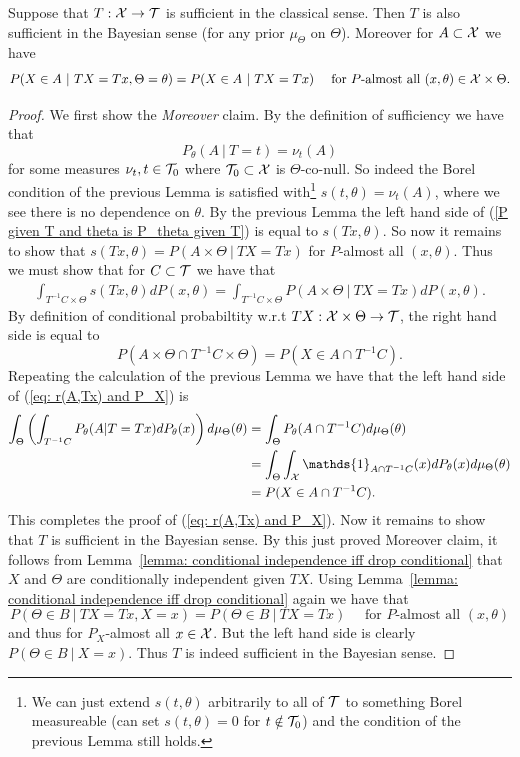 \documentclass[twoside, a4paper, 10pt]{amsart}
\begin{document}
\begin{thm} Suppose that $T:\mathcal{X} \to \mathcal{T}$ is sufficient in the classical sense. Then $T$ is also sufficient in the Bayesian sense (for any prior $\mu_{\Theta}$ on $\Theta$). Moreover for $A \subset \mathcal{X}$ we have \begin{align}\label{P given T and theta is P_theta given T} P(X \in A~|~ TX=Tx, \Theta = \theta) = P(X \in A~|~ TX=Tx)\quad \text{ for $P$-almost all $(x,\theta) \in \mathcal{X} \times \Theta$}.\end{align}

\end{thm}

\begin{proof} We first show the \textit{Moreover} claim. By the definition of sufficiency we have that $$P_{\theta}(A ~|~ T=t) = \nu_t(A) $$ for some measures $\nu_t, t \in \mathcal{T}_0$ where $\mathcal{T}_0 \subset \mathcal{X}$ is $\Theta$-co-null. So indeed the Borel condition of the previous Lemma is satisfied with\footnote{We can just extend $s(t, \theta)$ arbitrarily to all of $\mathcal{T}$ to something Borel measureable (can set $s(t, \theta)= 0$ for $t \notin \mathcal{T}_0$) and the condition of the previous Lemma still holds.}  $s(t, \theta) = \nu_t(A)$, where we see there is no dependence on $\theta$. By the previous Lemma the left hand side of (\ref{P given T and theta is P_theta given T}) is equal to $s(Tx,\theta)$.  So now it remains to show that $s(Tx,\theta) = P(A \times \Theta ~|~ TX=Tx)$ for $P$-almost all $(x,\theta)$. Thus we must show that for $C \subset \mathcal{T}$ we have that 
\begin{align}\label{eq: r(A,Tx) and P_X} \int_{T^{-1}C \times \Theta} s(Tx,\theta) dP(x,\theta) = \int_{T^{-1}C \times \Theta}  P(A \times \Theta ~|~ TX=Tx) dP(x,\theta).\end{align}
By definition of conditional probabiltity w.r.t $TX:\mathcal{X} \times \Theta \to \mathcal{T}$, the right hand side is equal to $$P(A \times \Theta \cap T^{-1}C \times \Theta) = P(X \in A \cap T^{-1}C).$$ 
Repeating the calculation of the previous Lemma we have that the left hand side of (\ref{eq: r(A,Tx) and P_X}) is
\begin{align*} \int_{\Theta} \left(\int_{T^{-1}C} P_{\theta}(A | T=Tx) dP_{\theta}(x) \right) d\mu_{\Theta}(\theta) &= \int_{\Theta} P_{\theta}(A \cap T^{-1}C) d\mu_{\Theta}(\theta) \\
&= \int_{\Theta} \int_{\cX} \mathds{1}_{A \cap T^{-1}C}(x) dP_{\theta}(x) d\mu_{\Theta}(\theta) \\
&= P(X \in A\cap T^{-1}C).\end{align*} 
This completes the proof of (\ref{eq: r(A,Tx) and P_X}). Now it remains to show that $T$ is sufficient in the Bayesian sense. By this just proved Moreover claim, it follows from Lemma~\ref{lemma: conditional independence iff drop conditional}  that $X$ and $\Theta$ are conditionally independent given $TX$. Using Lemma~\ref{lemma: conditional independence iff drop conditional} again we have that $$P(\Theta \in B ~|~ TX=Tx, X = x) = P(\Theta \in B ~|~ TX=Tx) \quad\text{ for $P$-almost all $(x,\theta)$}$$ and thus for $P_X$-almost all $x \in \mathcal{X}$. But the left hand side is clearly $P(\Theta \in B ~|~ X=x)$. Thus $T$ is indeed sufficient in the Bayesian sense. \end{proof}
\end{document}
